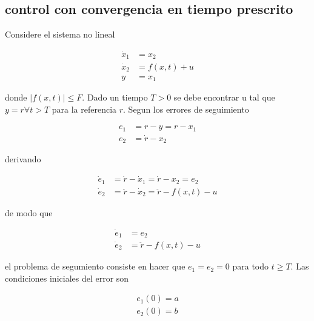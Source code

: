 \begin{flushright}
\end{flushright}

\subsection{control con convergencia en tiempo prescrito}

Considere el sistema no lineal

\begin{equation}
	\begin{aligned}
        \dot{x}_1&=x_2\\
	    \dot{x}_2&=f(x,t)+u\\
	    y&=x_1   
    \end{aligned}
\end{equation}

donde $|f(x,t)| \leq F$. Dado un tiempo $T>0$ se debe encontrar u tal que $y=r \forall t > T$ para la referencia $r$. Segun los errores de seguimiento

\begin{equation}
    \begin{aligned}
	    e_1&=r-y=r-x_1\\
	    e_2&=\dot{r}-x_2
    \end{aligned}
\end{equation}

derivando

\begin{equation}
    \begin{aligned}
	    \dot{e}_1&=\dot{r}-\dot{x}_1=\dot{r}-x_2=e_2\\
	    \dot{e}_2&=\ddot{r}-\dot{x}_2 = \ddot{r}-f(x,t)-u
    \end{aligned}
\end{equation}

de modo que

\begin{equation}
\begin{aligned}
	\dot{e}_1&=e_2 \\
	\dot{e}_2&=\ddot{r}-f(x,t)-u
\end{aligned}
\end{equation}

el problema de segumiento consiste en hacer que $e_1=e_2=0$ para todo $t\geq T$. Las condiciones iniciales del error son

\begin{equation}
\begin{aligned}
	e_1(0)=a\\
	e_2(0)=b
\end{aligned}
\end{equation}

